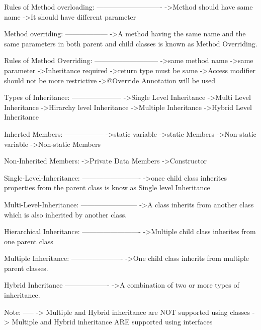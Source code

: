          Rules of Method overloading:
         ----------------------------
                  ->Method should have same name
                  ->It should have different parameter

   Method overriding:
   ------------------
                  ->A method having the same name and the same parameters in both parent and child classes is known as Method Overriding.

         Rules of Method Overriding:
         ---------------------------
                  ->same method name
                  ->same parameter
                  ->Inheritance required
                  ->return type must be same
                  ->Access modifier should not be more restrictive 
                  ->@Override Annotation will be used

   Types of Inheritance:
   ---------------------
               ->Single Level Inheritance
               ->Multi Level Inheritance
               ->Hirarchy level Inheritance
               ->Multiple Inheritance
               ->Hybrid Level Inheritance

   Inherted Members:
   -----------------
               ->static variable
               ->static Members
               ->Non-static variable
               ->Non-static Members

   Non-Inherited Members:
               ->Private Data Members
               ->Constructor

   Single-Level-Inheritance:
   -------------------------
                  ->once child class inherites properties from the parent class is know as Single level Inheritance

   Multi-Level-Inheritance:
   ------------------------
                  ->A class inherits from another class which is also inherited by another class.
   
   Hierarchical Inheritance:
   -------------------------
                  ->Multiple child class inherites from one parent class

   Multiple Inheritance:
   ----------------------
                  ->One child class inherits from multiple parent classes.

   Hybrid Inheritance
   -------------------
                  ->A combination of two or more types of inheritance.

   Note:
   -----
         -> Multiple and Hybrid inheritance are NOT supported using classes
         -> Multiple and Hybrid inheritance ARE supported using interfaces

